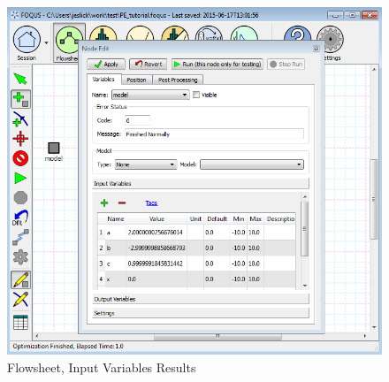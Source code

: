 \begin{figure}[H]
	\begin{center}
		\includegraphics[scale=0.55]{Chapt_optimization/figs/par_est_tut10}
		\caption{Flowsheet, Input Variables Results}
		\label{fig.pe.tut10}
	\end{center}
\end{figure}
